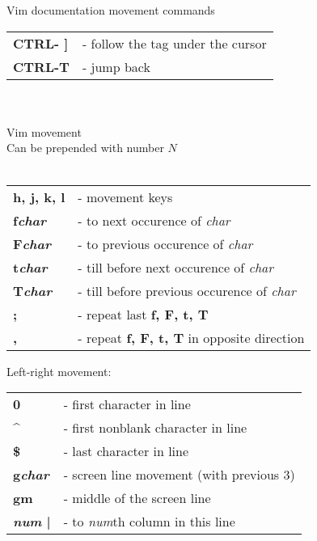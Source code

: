 \documentclass[a4paper,8pt]{extarticle}
\begin{document}
\begin{multicols*}{3}
        \noindent
        Vim documentation movement commands\\
        \begin{tabular}{ l l }
            \textbf{CTRL- ]}                    &    - follow the tag under the cursor                      \\
            \textbf{CTRL-T}                     &    - jump back                                            \\
        \end{tabular}\\\\
        \newpage
        \noindent
        {\Huge Vim movement}\\
        Can be prepended with number \(N\)\\\\
        \begin{tabular}{ l l }
            \textbf{h, j, k, l}                 &    - movement keys                                        \\
            \textbf{f\textsl{char}}             &    - to next occurence of \textsl{char}                   \\
            \textbf{F\textsl{char}}             &    - to previous occurence of \textsl{char}               \\
            \textbf{t\textsl{char}}             &    - till before next occurence of \textsl{char}          \\
            \textbf{T\textsl{char}}             &    - till before previous occurence of \textsl{char}      \\
            \textbf{;}                          &    - repeat last \textbf{f, F, t, T}                      \\
            \textbf{,}                          &    - repeat \textbf{f, F, t, T} in opposite direction     \\
        \end{tabular}

        \noindent
        {\large Left-right movement:}\\
        \begin{tabular}{ l l }
            \textbf{0}                          &    - first character in line                              \\
            \textbf{\^}                         &    - first nonblank character in line                     \\
            \textbf{\$}                         &    - last character in line                               \\
            \textbf{g\textsl{char}}             &    - screen line movement (with previous 3)               \\
            \textbf{gm}                         &    - middle of the screen line                            \\
            \textbf{\textsl{num} |}             &    - to \textsl{num}th column in this line                \\
        \end{tabular}


\end{multicols*}
\end{document}
